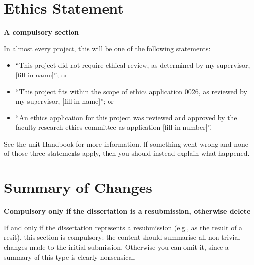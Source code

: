 \documentclass[ oneside,%
                    author={Michael Wray},
                    degree={BSc},
                     title={Some Structural Guidelines for CS Project Dissertations \\ With a Second Line Added to the Title},
                    unit={COMS30045},
                    subtitle={And Even A Fancy Subtitle}]{dissertation}
\begin{document}
\makeaidecl





\tableofcontents
\listoffigures
\listoftables




\chapter*{Ethics Statement}

{\bf A compulsory section} 
\vspace{1cm} 

In almost every project, this will be one of the following statements:
    \begin{itemize}
        \item ``This project did not require ethical review, as determined by my supervisor, [fill in name]''; or
        \item ``This project fits within the scope of ethics application 0026, as reviewed by my supervisor, [fill in name]''; or
        \item ``An ethics application for this project was reviewed and approved by the faculty research ethics committee as application [fill in number]''.
    \end{itemize}
    
See the unit Handbook for more information. If something went wrong and none of those three statements apply, then you should instead explain what happened.



\chapter*{Summary of Changes}

{\bf Compulsory only if the dissertation is a resubmission, otherwise delete} 
\vspace{1cm} 

If and only if the dissertation represents a resubmission (e.g., as the result of
a resit), this section is compulsory: the content should summarise all
non-trivial changes made to the initial submission.  Otherwise you can
omit it, since a summary of this type is clearly nonsensical.
\end{document}
